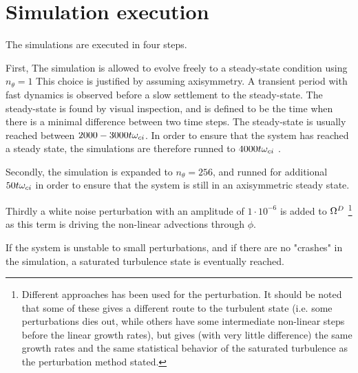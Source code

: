 \section{Simulation execution}
\label{sec:execution}
%
The simulations are executed in four steps.

First, The simulation is allowed to evolve freely to a steady-state condition using $n_\theta = 1$
This choice is justified by assuming axisymmetry.
A transient period with fast dynamics is observed before a slow settlement to the steady-state.
The steady-state is found by visual inspection, and is defined to be the time when there is a minimal difference between two time steps.
The steady-state is usually reached between $2000-3000t\omega_{ci}$.
In order to ensure that the system has reached a steady state, the simulations are therefore runned to $4000t\omega_{ci}$ .

Secondly, the simulation is expanded to $n_\theta = 256$, and runned for additional $50t\omega_{ci}$ in order to ensure that the system is still in an axisymmetric steady state.

Thirdly a white noise perturbation with an amplitude of $1\cdot10^{-6}$ is added to $\Omega^D$%
\footnote{Different approaches has been used for the perturbation.
    It should be noted that some of these gives a different route to the turbulent state (i.e. some perturbations dies out, while others have some intermediate non-linear steps before the linear growth rates), but gives (with very little difference) the same growth rates and the same statistical behavior of the saturated turbulence as the perturbation method stated.}
%
as this term is driving the non-linear advections through $\phi$.

If the system is unstable to small perturbations, and if there are no "crashes" in the simulation, a saturated turbulence state is eventually reached.

